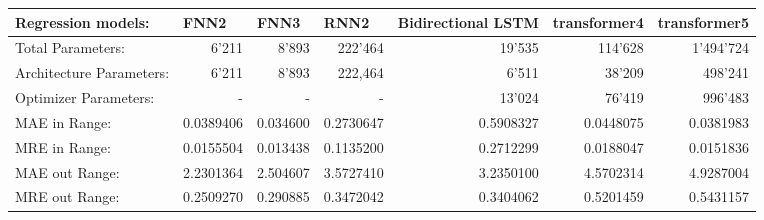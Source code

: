 \documentclass{article}
\begin{document}
\begin{table}[htbp]
\centering
\footnotesize
\begin{tabular}{|lr|r|r|r|r|r|r|}
\hline
\multicolumn{2}{|l|}{Regression models:}                              & \multicolumn{1}{l|}{FNN2} & \multicolumn{1}{l|}{FNN3}        & \multicolumn{1}{l|}{RNN2} & \multicolumn{1}{l|}{Bidirectional   LSTM} & \multicolumn{1}{l|}{transformer4} & \multicolumn{1}{l|}{transformer5} \\ \hline
\multicolumn{2}{|l|}{Total   Parameters:}                             & 6’211                     & 8’893                            & 222’464                   & 19’535                                    & 114’628                           & 1’494’724                         \\
\multicolumn{2}{|l|}{Architecture   Parameters:}                      & 6’211                     & 8’893                            & 222,464                   & 6’511                                     & 38’209                            & 498’241                           \\
\multicolumn{2}{|l|}{Optimizer   Parameters:}                         & -                         & -                                & -                         & 13’024                                    & 76’419                            & 996’483                           \\
\rowcolor[HTML]{F7C7AC} 
MAE in Range:                              &                          & 0.0389406                 & 0.034600                         & 0.2730647                 & 0.5908327                                 & 0.0448075                         & 0.0381983                         \\
\rowcolor[HTML]{F7C7AC} 
MRE in Range:                              &                          & 0.0155504                 & 0.013438                         & 0.1135200                 & 0.2712299                                 & 0.0188047                         & 0.0151836                         \\
\rowcolor[HTML]{94DCF8} 
MAE out Range:                             &                          & 2.2301364                 & \cellcolor[HTML]{83CCEB}2.504607 & 3.5727410                 & 3.2350100                                 & 4.5702314                         & 4.9287004                         \\
\rowcolor[HTML]{94DCF8} 
MRE out Range:                             &                          & 0.2509270                 & \cellcolor[HTML]{83CCEB}0.290885 & 0.3472042                 & 0.3404062                                 & 0.5201459                         & 0.5431157                         \\

\end{tabular}
\end{table}
\end{document}

